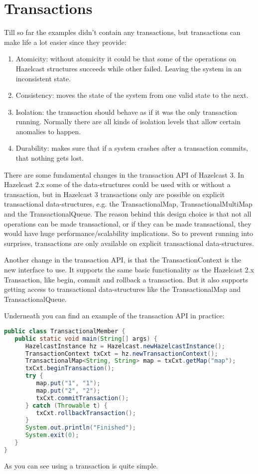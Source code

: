 \chapter{Transactions}
Till so far the examples didn't contain any transactions, but transactions can make life a lot easier since they provide:
\begin{enumerate}
\item Atomicity: without atomicity it could be that some of the operations on Hazelcast structures succeeds while other failed. Leaving the system in an inconsistent state.
\item Consistency: moves the state of the system from one valid state to the next.
\item Isolation: the transaction should behave as if it was the only transaction running. Normally there are all kinds of isolation levels that allow certain anomalies to happen.
\item Durability: makes sure that if a system crashes after a transaction commits, that nothing gets lost. 
\end{enumerate}

There are some fundamental changes in the transaction API of Hazelcast 3. In Hazelcast 2.x some of the data-structures could be used with or without a transaction, but in Hazelcast 3 transactions only are possible on explicit transactional data-structures, e.g. the TransactionalMap, TransactionalMultiMap and the TransactionalQueue. The reason behind this design choice is that not all operations can be made transactional, or if they can be made transactional, they would have huge performance/scalability implications. So to prevent running into surprises, transactions are only available on explicit transactional data-structures. 

Another change in the transaction API, is that the TransactionContext is the new interface to use. It supports the same basic functionality as the Hazelcast 2.x Transaction, like begin, commit and rollback a transaction. But it also supports getting access to transactional data-structures like the TransactionalMap and TransactionalQueue.

Underneath you can find an example of the transaction API in practice:
\begin{lstlisting}[language=java]
public class TransactionalMember {
   public static void main(String[] args) {
      HazelcastInstance hz = Hazelcast.newHazelcastInstance();
      TransactionContext txCxt = hz.newTransactionContext();
      TransactionalMap<String, String> map = txCxt.getMap("map");
      txCxt.beginTransaction();
      try {
         map.put("1", "1");
         map.put("2", "2");
         txCxt.commitTransaction();
      } catch (Throwable t) {
         txCxt.rollbackTransaction();
      }
      System.out.println("Finished");
      System.exit(0);
   }
}
\end{lstlisting}
As you can see using a transaction is quite simple. 

